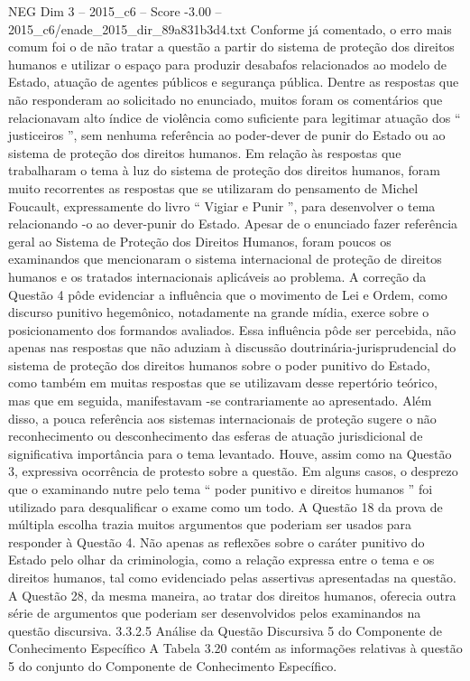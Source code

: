 \begin{textsample}{NEG Dim 3 – 2015\_c6 – Score -3.00 – 2015\_c6/enade\_2015\_dir\_89a831b3d4.txt}
Conforme já comentado, o erro mais comum foi o de não tratar a questão a partir do sistema de proteção dos direitos humanos e utilizar o espaço para produzir desabafos relacionados ao modelo de Estado, atuação de agentes públicos e segurança pública.
Dentre as respostas que não responderam ao solicitado no enunciado, muitos foram os comentários que relacionavam alto índice de violência como suficiente para legitimar atuação dos “ justiceiros ”, sem nenhuma referência ao poder-dever de punir do Estado ou ao sistema de proteção dos direitos humanos.
Em relação às respostas que trabalharam o tema à luz do sistema de proteção dos direitos humanos, foram muito recorrentes as respostas que se utilizaram do pensamento de Michel Foucault, expressamente do livro “ Vigiar e Punir ”, para desenvolver o tema relacionando -o ao dever-punir do Estado.
Apesar de o enunciado fazer referência geral ao Sistema de Proteção dos Direitos Humanos, foram poucos os examinandos que mencionaram o sistema internacional de proteção de direitos humanos e os tratados internacionais aplicáveis ao problema.
A correção da Questão 4 pôde evidenciar a influência que o movimento de Lei e Ordem, como discurso punitivo hegemônico, notadamente na grande mídia, exerce sobre o posicionamento dos formandos avaliados.
Essa influência pôde ser percebida, não apenas nas respostas que não aduziam à discussão doutrinária-jurisprudencial do sistema de proteção dos direitos humanos sobre o poder punitivo do Estado, como também em muitas respostas que se utilizavam desse repertório teórico, mas que em seguida, manifestavam -se contrariamente ao apresentado.
Além disso, a pouca referência aos sistemas internacionais de proteção sugere o não reconhecimento ou desconhecimento das esferas de atuação jurisdicional de significativa importância para o tema levantado.
Houve, assim como na Questão 3, expressiva ocorrência de protesto sobre a questão.
Em alguns casos, o desprezo que o examinando nutre pelo tema “ poder punitivo e direitos humanos ” foi utilizado para desqualificar o exame como um todo.
A Questão 18 da prova de múltipla escolha trazia muitos argumentos que poderiam ser usados para responder à Questão 4.
Não apenas as reflexões sobre o caráter punitivo do Estado pelo olhar da criminologia, como a relação expressa entre o tema e os direitos humanos, tal como evidenciado pelas assertivas apresentadas na questão.
A Questão 28, da mesma maneira, ao tratar dos direitos humanos, oferecia outra série de argumentos que poderiam ser desenvolvidos pelos examinandos na questão discursiva. 3.3.2.5 Análise da Questão Discursiva 5 do Componente de Conhecimento Específico A Tabela 3.20 contém as informações relativas à questão 5 do conjunto do Componente de Conhecimento Específico.

\end{textsample}
